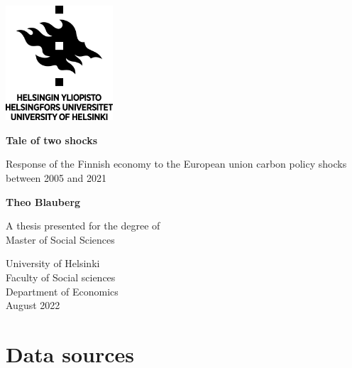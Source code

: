 \documentclass[
]{article}
\author{}
\date{\vspace{-2.5em}}
\begin{document}
\begin{titlepage}
    \begin{center}
        \vspace*{1cm}
        
        \includegraphics[width=0.3\textwidth]{latex/university.png}
        
        \vspace{1.5cm}
        
        \textbf{Tale of two shocks}
 
        \vspace{0.5cm}
         Response of the Finnish economy to the European union carbon policy shocks between 2005 and 2021 
             
        \vspace{0.5cm}
 
        \textbf{Theo Blauberg}
 
        \vfill
             
        A thesis presented for the degree of\\
        Master of Social Sciences
             
        \vspace{0.8cm}

    

    
        University of Helsinki\\
        Faculty of Social sciences\\
        Department of Economics\\
        August 2022

    \end{center}         
    
\end{titlepage}

{
\setcounter{tocdepth}{2}
\tableofcontents
}
\hypertarget{appendix-appendix}{%
\appendix}


\hypertarget{datasaources}{%
\section{Data sources}\label{datasaources}}
\end{document}
